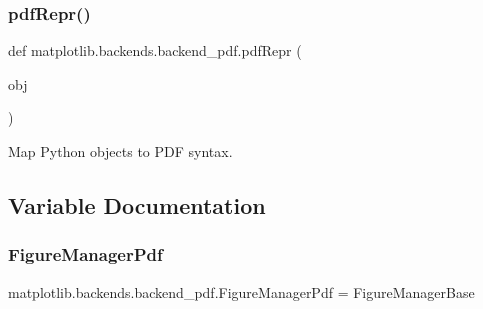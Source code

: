 \subsubsection{\texorpdfstring{pdf\+Repr()}{pdfRepr()}}
{\footnotesize\ttfamily def matplotlib.\+backends.\+backend\+\_\+pdf.\+pdf\+Repr (\begin{DoxyParamCaption}\item[{}]{obj }\end{DoxyParamCaption})}

\begin{DoxyVerb}Map Python objects to PDF syntax.\end{DoxyVerb}
 

\subsection{Variable Documentation}
\mbox{\label{namespacematplotlib_1_1backends_1_1backend__pdf_ab2cf0ff913055133077011d5129ff6ab}} 
\subsubsection{\texorpdfstring{Figure\+Manager\+Pdf}{FigureManagerPdf}}
{\footnotesize\ttfamily matplotlib.\+backends.\+backend\+\_\+pdf.\+Figure\+Manager\+Pdf = Figure\+Manager\+Base}

